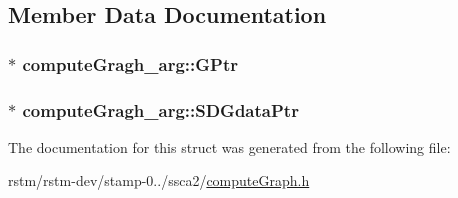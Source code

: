 \subsection{Member Data Documentation}
\hypertarget{structcomputeGragh__arg_a9d0cd599ed393a81a669afdd4a7a6cf4}{
\subsubsection[{G\-Ptr}]{$\ast$ compute\-Gragh\-\_\-arg\-::\-G\-Ptr}}\label{structcomputeGragh__arg_a9d0cd599ed393a81a669afdd4a7a6cf4}
\hypertarget{structcomputeGragh__arg_aeb45648df09de22d22f78307f7c479b2}{
\subsubsection[{S\-D\-Gdata\-Ptr}]{$\ast$ compute\-Gragh\-\_\-arg\-::\-S\-D\-Gdata\-Ptr}}\label{structcomputeGragh__arg_aeb45648df09de22d22f78307f7c479b2}


The documentation for this struct was generated from the following file\-:\begin{DoxyCompactItemize}
\item 
rstm/rstm-\/dev/stamp-\/0../ssca2/\hyperlink{computeGraph_8h}{compute\-Graph.\-h}\end{DoxyCompactItemize}
